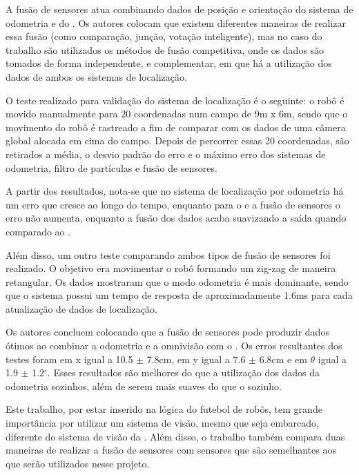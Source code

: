 \documentclass[acronym, symbols, table]{fei}
\begin{document}

A fusão de sensores atua combinando dados de posição e orientação do sistema de odometria e do . Os autores colocam que existem diferentes maneiras de realizar essa fusão (como comparação, junção, votação inteligente), mas no caso do trabalho são utilizados os métodos de fusão competitiva, onde os dados são tomados de forma independente, e complementar, em que há a utilização dos dados de ambos os sistemas de localização.

O teste realizado para validação do sistema de localização é o seguinte: o robô é movido manualmente para 20 coordenadas num campo de 9m x 6m, sendo que o movimento do robô é rastreado a fim de comparar com os dados de uma câmera global alocada em cima do campo. Depois de percorrer essas 20 coordenadas, são retirados a média, o desvio padrão do erro e o máximo erro dos sistemas de odometria, filtro de partículas e fusão de sensores.

A partir dos resultados, nota-se que no sistema de localização por odometria há um erro que cresce ao longo do tempo, enquanto para o  e a fusão de sensores o erro não aumenta, enquanto a fusão dos dados acaba suavizando a saída quando comparado ao .

Além disso, um outro teste comparando ambos tipos de fusão de sensores foi realizado. O objetivo era movimentar o robô formando um zig-zag de maneira retangular. Os dados mostraram que o modo odometria é mais dominante, sendo que o sistema possui um tempo de resposta de aproximadamente 1.6ms para cada atualização de dados de localização.

Os autores concluem colocando que a fusão de sensores pode produzir dados ótimos ao combinar a odometria e a omnivisão com o . Os erros resultantes dos testes foram em x igual a 10.5 $\pm$ 7.8cm, em y igual a 7.6 $\pm$ 6.8cm e em $\theta$ igual a 1.9 $\pm$ 1.2$^\circ$. Esses resultados são melhores do que a utilização dos dados da odometria sozinhos, além de serem mais suaves do que o  sozinho.

Este trabalho, por estar inserido na lógica do futebol de robôs, tem grande importância por utilizar um sistema de visão, mesmo que seja embarcado, diferente do sistema de visão da . Além disso, o trabalho também compara duas maneiras de realizar a fusão de sensores com sensores que são semelhantes aos que serão utilizados nesse projeto.
\end{document}
